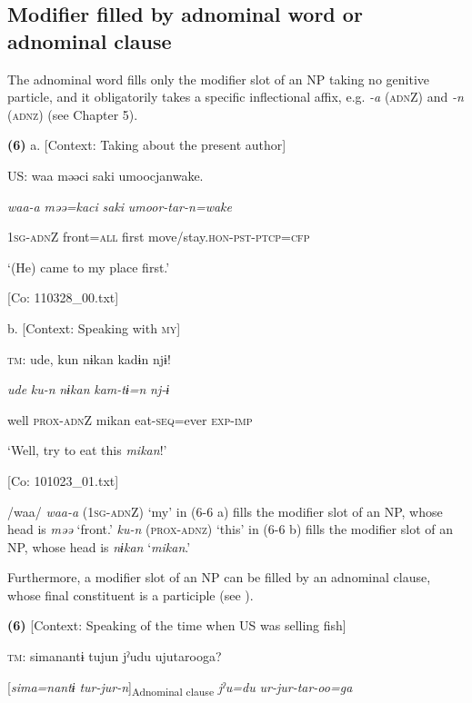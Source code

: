 \subsection{Modifier filled by adnominal word or adnominal clause}

The adnominal word fills only the modifier slot of an NP taking no genitive particle, and it obligatorily takes a specific inflectional affix, e.g. \textit{{}-a} (\textsc{adn}Z) and \textit{{}-n} (\textsc{adnz}) (see Chapter 5).

\textbf{(6)}  a.  [Context: Taking about the present author]

    US:  waa  məəci  saki  umoocjanwake.

      \textit{waa-a}  \textit{məə=kaci}  \textit{saki}  \textit{umoor-tar-n=wake}

      1\textsc{sg}-\textsc{adn}Z  front=\textsc{all}  first  move/stay.\textsc{hon}-\textsc{pst}-\textsc{ptcp}=\textsc{cfp}

      ‘(He) came to my place first.’

      [Co: 110328\_00.txt]

  b.  [Context: Speaking with \textsc{my}]

    \textsc{tm}:  ude,  kun  nɨkan  kadɨn  njɨ!

      \textit{ude}  \textit{ku-n}  \textit{nɨkan}  \textit{kam-tɨ=n}  \textit{nj-ɨ}

      well  \textsc{prox}-\textsc{adn}Z  mikan  eat-\textsc{seq}=ever  \textsc{exp}-\textsc{imp}

      ‘Well, try to eat this \textit{mikan}!’

      [Co: 101023\_01.txt]

/waa/ \textit{waa-a} (1\textsc{sg}-\textsc{adn}Z) ‘my’ in (6-6 a) fills the modifier slot of an NP, whose head is \textit{məə} ‘front.’ \textit{ku-n} (\textsc{prox}-\textsc{adnz}) ‘this’ in (6-6 b) fills the modifier slot of an NP, whose head is \textit{nɨkan} ‘\textit{mikan}.’

  Furthermore, a modifier slot of an NP can be filled by an adnominal clause, whose final constituent is a participle (see ).

\textbf{(6)}  [Context: Speaking of the time when US was selling fish]

  \textsc{tm}:  simanantɨ  tujun  jˀudu  ujutarooga?

    [\textit{sima=nantɨ}  \textit{tur-jur-n}]\textsubscript{Adnominal clause}  \textit{jˀu=du}  \textit{ur-jur-tar-oo=ga}

